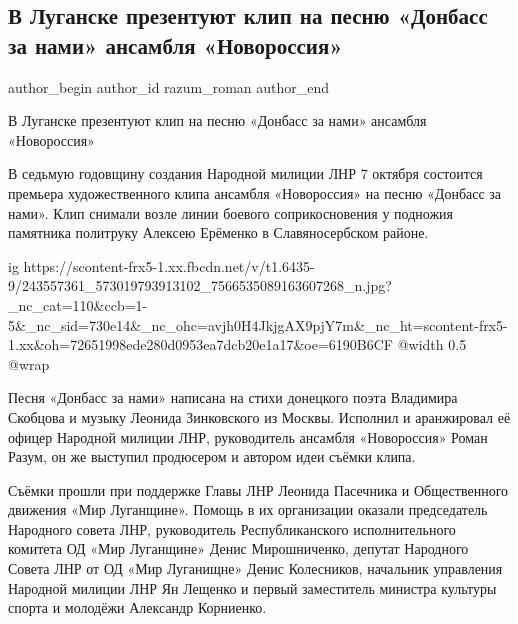  
 
 
 
 
 
\subsection{В Луганске презентуют клип на песню «Донбасс за нами» ансамбля «Новороссия»}
\label{sec:01_10_2021.fb.razum_roman.1.premjera_klipa_donbass_za_nami}
 
\ifcmt
 author_begin
   author_id razum_roman
 author_end
\fi

В Луганске презентуют клип на песню «Донбасс за нами» ансамбля «Новороссия»

В седьмую годовщину создания Народной милиции ЛНР 7 октября состоится премьера
художественного клипа ансамбля «Новороссия» на песню «Донбасс за нами». Клип
снимали возле линии боевого соприкосновения у подножия памятника политруку
Алексею Ерёменко в Славяносербском районе.

\ifcmt
  ig https://scontent-frx5-1.xx.fbcdn.net/v/t1.6435-9/243557361_573019793913102_7566535089163607268_n.jpg?_nc_cat=110&ccb=1-5&_nc_sid=730e14&_nc_ohc=avjh0H4JkjgAX9pjY7m&_nc_ht=scontent-frx5-1.xx&oh=72651998ede280d0953ea7dcb20e1a17&oe=6190B6CF
  @width 0.5
	@wrap 
\fi

Песня «Донбасс за нами» написана на стихи донецкого поэта Владимира Скобцова и
музыку Леонида Зинковского из Москвы. Исполнил и аранжировал её офицер Народной
милиции ЛНР, руководитель ансамбля «Новороссия» Роман Разум, он же выступил
продюсером и автором идеи съёмки клипа.

Съёмки прошли при поддержке Главы ЛНР Леонида Пасечника и Общественного
движения «Мир Луганщине». Помощь в их организации оказали председатель
Народного совета ЛНР, руководитель Республиканского исполнительного комитета ОД
«Мир Луганщине» Денис Мирошниченко, депутат Народного Совета ЛНР от ОД «Мир
Луганищне» Денис Колесников, начальник управления Народной милиции ЛНР Ян
Лещенко и первый заместитель министра культуры спорта и молодёжи Александр
Корниенко.

